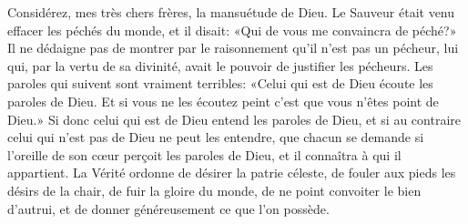 Considérez, mes très chers frères, la mansuétude de Dieu.
Le Sauveur était venu effacer les péchés du monde, et il disait:
	«Qui de vous me convaincra de péché?»
Il ne dédaigne pas de montrer par le raisonnement qu’il n’est pas un pécheur,
	lui qui, par la vertu de sa divinité,
	avait le pouvoir de justifier les pécheurs.
Les paroles qui suivent sont vraiment terribles:
	«Celui qui est de Dieu écoute les paroles de Dieu.
	Et si vous ne les écoutez peint c’est que vous n’êtes point de Dieu.»
Si donc celui qui est de Dieu entend les paroles de Dieu,
	et si au contraire celui qui n’est pas de Dieu ne peut les entendre,
	que chacun se demande si l’oreille de son cœur perçoit les paroles de Dieu,
	et il connaîtra à qui il appartient.
La Vérité ordonne de désirer la patrie céleste,
	de fouler aux pieds les désirs de la chair,
	de fuir la gloire du monde,
	de ne point convoiter le bien d’autrui,
	et de donner généreusement ce que l’on possède.
